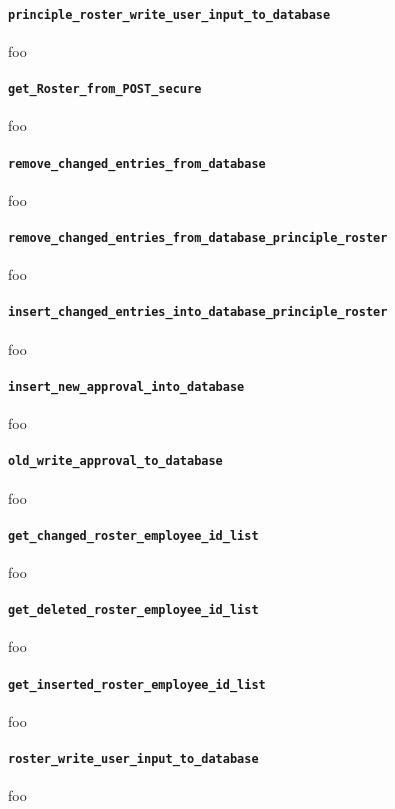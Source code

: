 \paragraph{\lstinline|principle_roster_write_user_input_to_database|} foo
\paragraph{\lstinline|get_Roster_from_POST_secure|} foo
\paragraph{\lstinline|remove_changed_entries_from_database|} foo
\paragraph{\lstinline|remove_changed_entries_from_database_principle_roster|} foo
\paragraph{\lstinline|insert_changed_entries_into_database_principle_roster|} foo
\paragraph{\lstinline|insert_new_approval_into_database|} foo
\paragraph{\lstinline|old_write_approval_to_database|} foo
\paragraph{\lstinline|get_changed_roster_employee_id_list|} foo
\paragraph{\lstinline|get_deleted_roster_employee_id_list|} foo
\paragraph{\lstinline|get_inserted_roster_employee_id_list|} foo
\paragraph{\lstinline|roster_write_user_input_to_database|} foo






